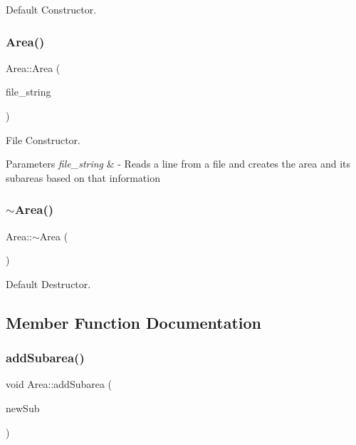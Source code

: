 Default Constructor. 

\mbox{\label{classArea_afd32499f2246ef8007fd135d7503da16}} 
\subsubsection{\texorpdfstring{Area()}{Area()}\hspace{0.1cm}{\footnotesize\ttfamily [2/2]}}
{\footnotesize\ttfamily Area\+::\+Area (\begin{DoxyParamCaption}\item[{std\+::string}]{file\+\_\+string }\end{DoxyParamCaption})}



File Constructor. 


\begin{DoxyParams}{Parameters}
{\em file\+\_\+string} & -\/ Reads a line from a file and creates the area and its subareas based on that information \\
\hline
\end{DoxyParams}
\mbox{\label{classArea_ace0975982b61a16746c564a0d43a4cc8}} 
\subsubsection{\texorpdfstring{$\sim$\+Area()}{~Area()}}
{\footnotesize\ttfamily Area\+::$\sim$\+Area (\begin{DoxyParamCaption}{ }\end{DoxyParamCaption})\hspace{0.3cm}{\ttfamily [virtual]}}



Default Destructor. 



\subsection{Member Function Documentation}
\mbox{\label{classArea_a137ad0664d3993ff994e2381804459e2}} 
\subsubsection{\texorpdfstring{add\+Subarea()}{addSubarea()}}
{\footnotesize\ttfamily void Area\+::add\+Subarea (\begin{DoxyParamCaption}\item[{\hyperlink{classSubArea}{Sub\+Area} $\ast$}]{new\+Sub }\end{DoxyParamCaption})}



